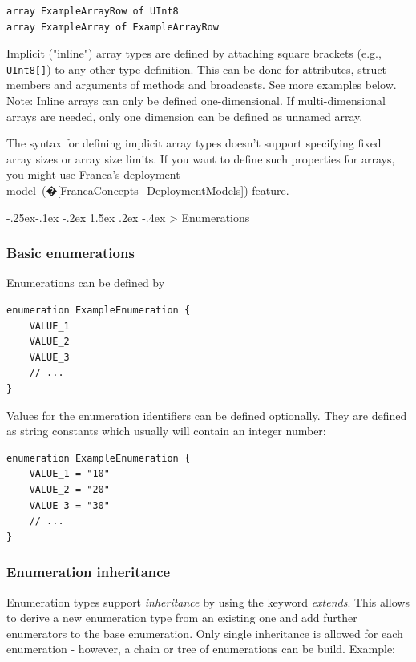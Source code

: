 \documentclass[a4paper,10pt]{scrreprt}
\makeatletter
\renewcommand\subsection{\medskip\@startsection{subsection}{2}{\z@}%
  {-.25ex\@plus -.1ex \@minus -.2ex}%
  {1.5ex \@plus .2ex \@minus -.4ex}%
  {\ifnum \scr@compatibility>\@nameuse{scr@v@2.96}\relax
    \setlength{\parfillskip}{\z@ plus 1fil}\fi
    \raggedsection\normalfont\sectfont\nobreak\size@subsection
  }%
}
\makeatother
\begin{document}
\begin{lstlisting}[language=Franca]
array ExampleArrayRow of UInt8
array ExampleArray of ExampleArrayRow
\end{lstlisting}

Implicit ("inline") array types are defined by attaching square brackets (e.g., \protect\lstinline[language=Franca]{UInt8[]})
to any other type definition. This can be done for attributes, struct members and
arguments of methods and broadcasts. See more examples below. Note: Inline arrays can only be defined
one-dimensional. If multi-dimensional arrays are needed, only one dimension can be defined as unnamed
array. 

The syntax for defining implicit array types doesn't support specifying fixed array sizes or
array size limits. If you want to define such properties for arrays, you might use Franca's
\hyperref[FrancaConcepts_DeploymentModels]{deployment model~(�\ref*{FrancaConcepts_DeploymentModels})} feature.

\subsection{Enumerations}
\label{FIDL_Types_Enum}
\subsubsection{Basic enumerations}
\label{FIDL_Types_Enum_Basic}
Enumerations can be defined by

\begin{lstlisting}[language=Franca]
enumeration ExampleEnumeration {
	VALUE_1
	VALUE_2
	VALUE_3
	// ...
}
\end{lstlisting}

Values for the enumeration identifiers can be defined optionally.
They are defined as string constants which usually will contain an integer number:

\begin{lstlisting}[language=Franca]
enumeration ExampleEnumeration {
	VALUE_1 = "10"
	VALUE_2 = "20"
	VALUE_3 = "30"
	// ...
}
\end{lstlisting}

\subsubsection{Enumeration inheritance}
\label{FIDL_Types_Enum_Inheritance}
Enumeration types support \textit{inheritance} by using the keyword \textit{extends}.
This allows to derive a new enumeration type from an existing one and add
further enumerators to the base enumeration. Only single inheritance is allowed for
each enumeration - however, a chain or tree of enumerations can be build. Example:
\end{document}
